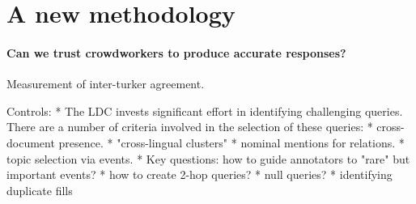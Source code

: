 \section{A new methodology}

\paragraph{Can we trust crowdworkers to produce accurate responses?}

Measurement of inter-turker agreement.

Controls:
* The LDC invests significant effort in identifying challenging queries. There are a number of criteria involved in the selection of these queries:
  * cross-document presence.
  * "cross-lingual clusters"
  * nominal mentions for relations.
  * topic selection via events.
* Key questions: how to guide annotators to "rare" but important events?
  * how to create 2-hop queries?
  * null queries?
  * identifying duplicate fills

